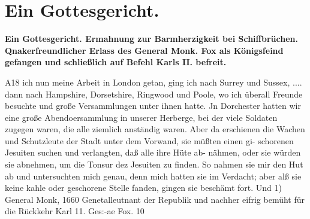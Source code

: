 
\chapter[Ein Gottesgericht.]{Ein Gottesgericht.}

\begin{center}
\textbf{Ein Gottesgericht. Ermahnung zur Barmherzigkeit bei 
Schiffbrüchen. Qnakerfreundlicher Erlass des General Monk. 
Fox als Königsfeind
gefangen und schließlich auf Befehl Karls II. befreit.}
\end{center}


A18 ich nun meine Arbeit in London getan, ging ich nach
Surrey und Sussex, .... dann nach Hampshire, Dorsetshire,
Ringwood und Poole, wo ich überall Freunde besuchte und große
Versammlungen unter ihnen hatte.
Jn Dorchester hatten wir eine große Abendoersammlung in
unserer Herberge, bei der viele Soldaten zugegen waren, die alle
ziemlich anständig waren. Aber da erschienen die Wachen und
Schutzleute der Stadt unter dem Vorwand, sie müßten einen gi-
schorenen Jesuiten suchen und verlangten, daß alle ihre Hüte ab-
nähmen, oder sie würden sie abnehmen, um die Tonsur dez Jesuiten
zu finden. So nahmen sie mir den Hut ab und untersuchten
mich genau, denn mich hatten sie im Verdacht; aber alß sie keine
kahle oder geschorene Stelle fanden, gingen sie beschämt fort. Und
1) General Monk, 1660 Genetalleutnant der Republik und nachher eifrig
bemüht für die Rückkehr Karl 11.
Ges:-ae Fox. 10


